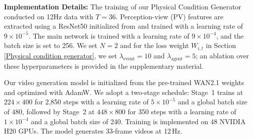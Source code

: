 \documentclass[runningheads]{llncs}
\begin{document}
\setlength{\parskip}{1pt}
\noindent \textbf{Implementation Details:}  
The training of our Physical Condition Generator conducted on 12Hz data with $T=36$. Perception-view (PV) features are extracted using a ResNet50 \cite{he2016deep} initialized from \cite{sun2025sparsedrive} and trained with a learning rate of $9 \times 10^{-5}$. The main network is trained with a learning rate of $9 \times 10^{-4}$, and the batch size is set to 256. We set $N=2$ and for the loss weight $W_{i,t}$  in Section \ref{Physical condition generator}, we set $\lambda_{\text{event}}=10$ and $\lambda_{\text{agent}}=5$; an ablation over these hyperparameters is provided in the supplementary material.


Our video generation model is initialized from the pre-trained WAN2.1 weights and optimized with AdamW. We adopt a two-stage schedule: Stage~1 trains at $224\times 400$ for 2{,}850 steps with a learning rate of $5\times 10^{-5}$ and a global batch size of 480, followed by Stage~2 at $448\times 800$ for 350 steps with a learning rate of $1\times 10^{-4}$ and a global batch size of 240. Training is implemented on 48 NVIDIA H20 GPUs. The model generates 33-frame videos at 12\,Hz.
\end{document}
